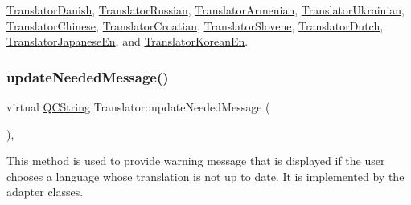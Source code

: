 \mbox{\hyperlink{class_translator_danish_aab009d63da34b815ec122c2d5b4455f1}{Translator\+Danish}}, \mbox{\hyperlink{class_translator_russian_aa439d190ee58e9b8e2d1b15548bb90a2}{Translator\+Russian}}, \mbox{\hyperlink{class_translator_armenian_ad22ecd1b8a7b28d49ef44ffec09f555e}{Translator\+Armenian}}, \mbox{\hyperlink{class_translator_ukrainian_a037dd5f67672c74e193979dd3737a69c}{Translator\+Ukrainian}}, \mbox{\hyperlink{class_translator_chinese_a0935a089ac2dc882cf25fe6cf1185fee}{Translator\+Chinese}}, \mbox{\hyperlink{class_translator_croatian_a1d7d6ab4fe3d62e5eaf1060da020cca2}{Translator\+Croatian}}, \mbox{\hyperlink{class_translator_slovene_a3cb28c1244be75e56b524294bf30a5a6}{Translator\+Slovene}}, \mbox{\hyperlink{class_translator_dutch_aefa5abdf5065d86bc2a02c95c301118a}{Translator\+Dutch}}, \mbox{\hyperlink{class_translator_japanese_en_aff3e71dc3a1d71f056fea3299c8a427e}{Translator\+Japanese\+En}}, and \mbox{\hyperlink{class_translator_korean_en_ad0ac561385e4e2583eb5f3aaf5303f4d}{Translator\+Korean\+En}}.

\mbox{\label{class_translator_a8841e027d8a0e661d0cef7e06d75c22a}} 
\subsubsection{\texorpdfstring{updateNeededMessage()}{updateNeededMessage()}}
{\footnotesize\ttfamily virtual \mbox{\hyperlink{class_q_c_string}{Q\+C\+String}} Translator\+::update\+Needed\+Message (\begin{DoxyParamCaption}{ }\end{DoxyParamCaption})\hspace{0.3cm}{\ttfamily [inline]}, {\ttfamily [virtual]}}

This method is used to provide warning message that is displayed if the user chooses a language whose translation is not up to date. It is implemented by the adapter classes. 

